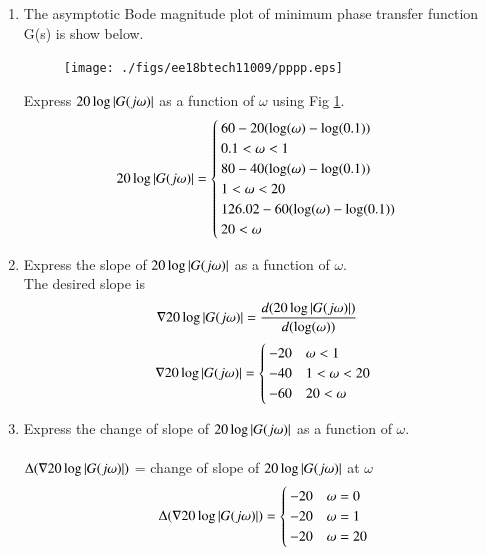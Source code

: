 \begin{enumerate}[label=\thesubsection.\arabic*.,ref=\thesubsection.\theenumi]
\item 
The asymptotic Bode magnitude plot of  minimum phase transfer function
G(s) is show below.
\begin{figure}[htp]
	\centering
	\texttt{[image: ./figs/ee18btech11009/pppp.eps]}
	\caption{}
	\label{fig:given_bode}
\end{figure} 
%
Express $20\log\left\vert G(j\omega)\right\vert$ as a function of $\omega$ using Fig \ref{fig:given_bode}.
\label{prob:plot} \\
\solution
\begin{align}
 20\log\left\vert G(j\omega)\right\vert = 
 \begin{cases}
	60-20(\log(\omega)-\log(0.1)) \\   0.1 < \omega < 1 \\
	80-40(\log(\omega)-\log(0.1)) \\   1 < \omega < 20 \\
	126.02-60(\log(\omega)-\log(0.1)) \\   20 < \omega   
 \end{cases}
\end{align}


\item Express the slope of $20\log\left\vert G(j\omega)\right\vert$ as a function of $\omega$. 
\\
\solution The desired slope is
\begin{align}
 \nabla20\log\left\vert G(j\omega)\right\vert &= \dfrac{d(20\log\left\vert G(j\omega)\right\vert)}{d(\log(\omega))}
\end{align}
\begin{align}
 \nabla20\log\left\vert G(j\omega)\right\vert = 
 \begin{cases}
	-20 &  \omega < 1 \\
	-40 & 1 < \omega < 20 \\
	-60 & 20 < \omega   
 \end{cases}
\end{align}

\item Express the change of slope of $20\log\left\vert G(j\omega)\right\vert$ as a function of $\omega$. \\
\solution \\ 
 $\Delta(\nabla20\log\left\vert G(j\omega)\right\vert)$ = change of slope of $20\log\left\vert G(j\omega)\right\vert$ at $\omega$ 
\begin{align}
 \Delta(\nabla20\log\left\vert G(j\omega)\right\vert) = 
 \begin{cases}
    -20 &  \omega = 0 \\
	-20 &  \omega = 1 \\
	-20 &  \omega = 20
 \end{cases}
\end{align}


\end{enumerate}
